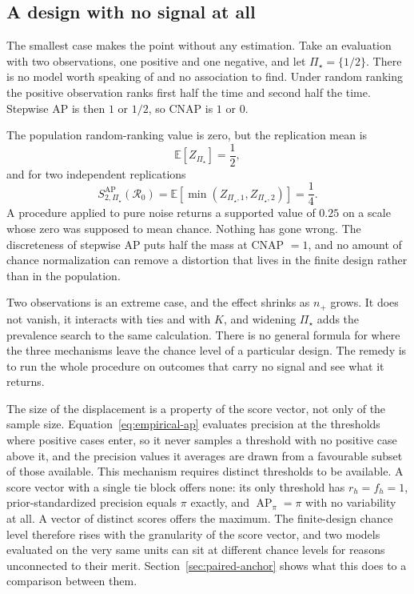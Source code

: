 \documentclass[11pt]{article}
\newcommand{\AP}{\operatorname{AP}}
\newcommand{\Regime}{\mathcal{R}}
\newcommand{\PSet}{\Pi_\star}
\newcommand{\E}{\mathbb{E}}
\theoremstyle{remark}
\begin{document}
\subsection{A design with no signal at all}

The smallest case makes the point without any estimation. Take an evaluation with two observations, one positive and one negative, and let $\PSet=\{1/2\}$. There is no model worth speaking of and no association to find. Under random ranking the positive observation ranks first half the time and second half the time. Stepwise AP is then $1$ or $1/2$, so CNAP is $1$ or $0$.

The population random-ranking value is zero, but the replication mean is
\[
\E[Z_{\PSet}]
=
\frac12,
\]
and for two independent replications
\[
S_{2,\PSet}^{\mathrm{AP}}(\Regime_0)
=
\E[\min(Z_{\PSet,1},Z_{\PSet,2})]
=
\frac14.
\]
A procedure applied to pure noise returns a supported value of $0.25$ on a scale whose zero was supposed to mean chance. Nothing has gone wrong. The discreteness of stepwise AP puts half the mass at CNAP $=1$, and no amount of chance normalization can remove a distortion that lives in the finite design rather than in the population.

Two observations is an extreme case, and the effect shrinks as $n_+$ grows. It does not vanish, it interacts with ties and with $K$, and widening $\PSet$ adds the prevalence search to the same calculation. There is no general formula for where the three mechanisms leave the chance level of a particular design. The remedy is to run the whole procedure on outcomes that carry no signal and see what it returns.

The size of the displacement is a property of the score vector, not only of the sample size. Equation~\eqref{eq:empirical-ap} evaluates precision at the thresholds where positive cases enter, so it never samples a threshold with no positive case above it, and the precision values it averages are drawn from a favourable subset of those available. This mechanism requires distinct thresholds to be available. A score vector with a single tie block offers none: its only threshold has $r_h=f_h=1$, prior-standardized precision equals $\pi$ exactly, and $\AP_\pi=\pi$ with no variability at all. A vector of distinct scores offers the maximum. The finite-design chance level therefore rises with the granularity of the score vector, and two models evaluated on the very same units can sit at different chance levels for reasons unconnected to their merit. Section~\ref{sec:paired-anchor} shows what this does to a comparison between them.
\end{document}
